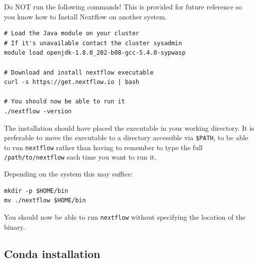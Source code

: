 \begin{warning}

Do NOT run the following commands! 
This is provided for future reference so you know how to Install Nextflow on another system. 

\begin{steps}
\begin{lstlisting}
# Load the Java module on your cluster
# If it's unavailable contact the cluster sysadmin
module load openjdk-1.8.0_202-b08-gcc-5.4.0-sypwasp 

# Download and install nextflow executable
curl -s https://get.nextflow.io | bash

# You should now be able to run it
./nextflow -version
\end{lstlisting}
\end{steps}

The installation should have placed the executable in your working directory.
It is preferable to move the executable to a directory accessible via \texttt{\$PATH}, 
to be able to run \texttt{nextflow} rather than having to remember 
to type the full \texttt{/path/to/nextflow} each time you want to run it.

Depending on the system this may suffice:

\begin{steps}
\begin{lstlisting}
mkdir -p $HOME/bin
mv ./nextflow $HOME/bin
\end{lstlisting}
\end{steps}

You should now be able to run \texttt{nextflow} without specifying the location of the binary.

\end{warning}


\subsection{Conda installation}


